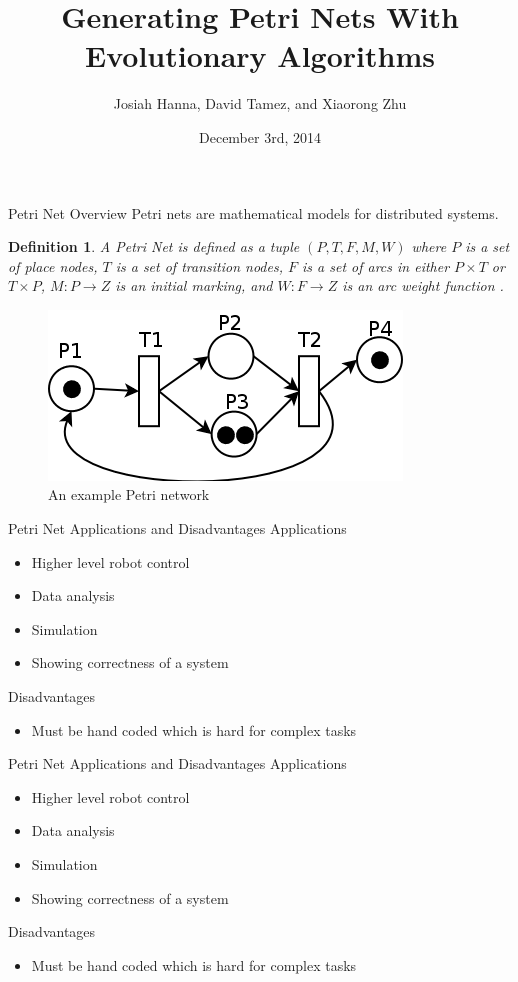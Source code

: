 \documentclass[12pt]{beamer}
\author{Josiah Hanna, David Tamez, and Xiaorong Zhu}
\title{Generating Petri Nets With Evolutionary Algorithms}
\institute{The University of Texas at Austin}
\date{December 3rd, 2014}
\newtheorem{myDef}{Definition}
\begin{document}
\begin{frame}
\titlepage
\end{frame}

\begin{frame}{Petri Net Overview}
Petri nets are mathematical models for distributed systems.
\begin{myDef}
A Petri Net is defined as a tuple $(P,T,F,M,W)$ where $P$ is a set of place nodes, $T$ is a set of transition nodes, $F$ is a set of arcs in either $P \times T$ or $T \times P$, $M: P \rightarrow Z$ is an initial marking, and $W: F \rightarrow Z$ is an arc weight function \cite{PNP}.
\end{myDef}
\begin{figure}
\includegraphics[scale=0.25]{petri_net.png}
\caption[]{An example Petri network \label{exampleNet}}
\end{figure}
\end{frame}

\begin{frame}{Petri Net Applications and Disadvantages}
Applications
\begin{itemize}
\item Higher level robot control
\item Data analysis
\item Simulation
\item Showing correctness of a system
\end{itemize}
Disadvantages
\begin{itemize}
\item Must be hand coded which is hard for complex tasks
\end{itemize}
\end{frame}
\begin{frame}{Petri Net Applications and Disadvantages}
Applications
\begin{itemize}
\item Higher level robot control
\item Data analysis
\item Simulation
\item Showing correctness of a system
\end{itemize}
Disadvantages
\begin{itemize}
\item Must be hand coded which is hard for complex tasks
\end{itemize}

\bigskip

\end{frame}
\end{document}
